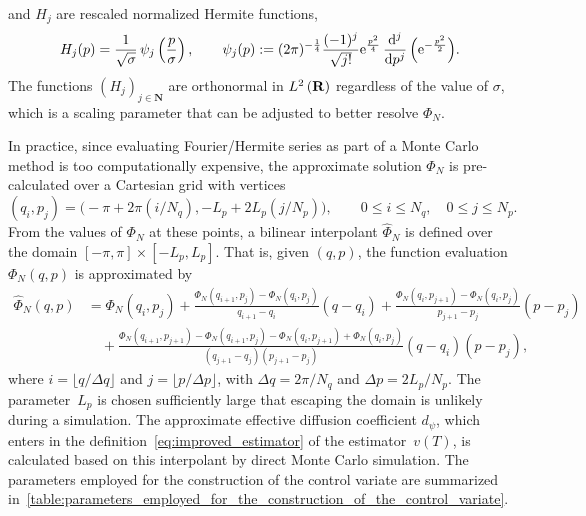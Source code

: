 \documentclass[11pt,a4paper]{article}
\newcommand{\e}{\mathrm{e}}
\newcommand{\nat}{\mathbf N}
\newcommand{\real}{\mathbf R}
\theoremstyle{plain}
\numberwithin{equation}{section}
\renewcommand{\leq}{\leqslant}
\begin{document}
and $H_j$ are rescaled normalized Hermite functions,
\begin{equation}
  \label{eq:definition_hermite_functions}
  H_j(p) = \frac{1}{\sqrt{\sigma}} \, \psi_j \left( \frac{p}{\sigma} \right),
  \qquad \psi_j (p) := (2 \pi)^{-\frac{1}{4}} \frac{(-1)^j}{\sqrt{j!}} \e^{\frac{p^2}{4}} \, \derivative*{j}{p^j} \, \Bigl( \e^{- \frac{p^2}{2}} \Bigr).
\end{equation}
The functions $(H_j)_{j\in \nat}$ are orthonormal in $\lp{2}{\real}$ regardless of the value of $\sigma$,
which is a scaling parameter that can be adjusted to better resolve $\Phi_N$.

In practice, since evaluating Fourier/Hermite series as part of a Monte Carlo method is too computationally expensive,
the approximate solution $\Phi_N$ is pre-calculated over a Cartesian grid with vertices
\[
    (q_i, p_j) = \bigl(- \pi + 2\pi(i/N_q) , - L_p + 2L_p (j/N_p) \bigr), \qquad 0 \leq i \leq N_q, \quad 0 \leq j \leq N_p.
\]
From the values of $\Phi_N$ at these points,
a bilinear interpolant $\widehat \Phi_N$ is defined over the domain $[-\pi, \pi] \times [-L_p, L_p]$.
That is, given $(q, p)$, the function evaluation $\Phi_N(q, p)$ is approximated by
\begin{align*}
    \widehat \Phi_N(q, p)
    &= \Phi_N(q_i,p_j) + \frac{\Phi_N(q_{i+1}, p_j) - \Phi_N(q_i, p_j)}{q_{i+1} - q_i} (q - q_i)
    +\frac{\Phi_N(q_{i}, p_{j+1}) - \Phi_N(q_{i}, p_{j})}{p_{j+1} - p_j} (p - p_j) \\
    &\quad + \frac{\Phi_N(q_{i+1}, p_{j+1}) - \Phi_N(q_{i+1}, p_{j}) - \Phi_N(q_{i}, p_{j+1}) + \Phi_N(q_{i}, p_{j})}{(q_{j+1} - q_j)(p_{j+1} - p_j)}  (q-q_i)(p-p_j),
\end{align*}
where $i = \lfloor q / \Delta q \rfloor$ and $j = \lfloor p / \Delta p \rfloor$,
with $\Delta q = 2\pi/N_q$ and $\Delta p = 2L_p/N_p$.
The parameter~$L_p$ is chosen sufficiently large that escaping the domain is unlikely during a simulation.
The approximate effective diffusion coefficient $d_\psi$,
which enters in the definition~\eqref{eq:improved_estimator} of the estimator~$v(T)$,
is calculated based on this interpolant by direct Monte Carlo simulation.
The parameters employed for the construction of the control variate are summarized in~\cref{table:parameters_employed_for_the_construction_of_the_control_variate}.
\end{document}
